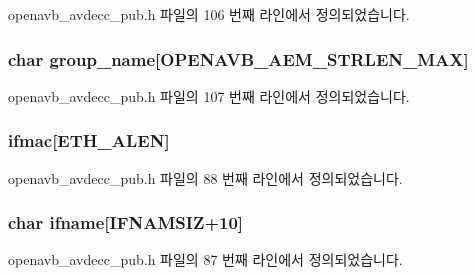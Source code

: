 openavb\+\_\+avdecc\+\_\+pub.\+h 파일의 106 번째 라인에서 정의되었습니다.

\subsubsection[{\texorpdfstring{group\+\_\+name}{group_name}}]{\setlength{\rightskip}{0pt plus 5cm}char group\+\_\+name\mbox{[}{\bf O\+P\+E\+N\+A\+V\+B\+\_\+\+A\+E\+M\+\_\+\+S\+T\+R\+L\+E\+N\+\_\+\+M\+AX}\mbox{]}}\hypertarget{structopenavb__avdecc__cfg__t_a4089e7b5575e5dda250db1b7c4343dd5}{}\label{structopenavb__avdecc__cfg__t_a4089e7b5575e5dda250db1b7c4343dd5}


openavb\+\_\+avdecc\+\_\+pub.\+h 파일의 107 번째 라인에서 정의되었습니다.

\subsubsection[{\texorpdfstring{ifmac}{ifmac}}]{ ifmac\mbox{[}{\bf E\+T\+H\+\_\+\+A\+L\+EN}\mbox{]}}\hypertarget{structopenavb__avdecc__cfg__t_adc83f17023461d176d86627c972fcf3e}{}\label{structopenavb__avdecc__cfg__t_adc83f17023461d176d86627c972fcf3e}


openavb\+\_\+avdecc\+\_\+pub.\+h 파일의 88 번째 라인에서 정의되었습니다.

\subsubsection[{\texorpdfstring{ifname}{ifname}}]{\setlength{\rightskip}{0pt plus 5cm}char ifname\mbox{[}{\bf I\+F\+N\+A\+M\+S\+IZ}+10\mbox{]}}\hypertarget{structopenavb__avdecc__cfg__t_a11d6071e5fa37b0c5776e17651485f11}{}\label{structopenavb__avdecc__cfg__t_a11d6071e5fa37b0c5776e17651485f11}


openavb\+\_\+avdecc\+\_\+pub.\+h 파일의 87 번째 라인에서 정의되었습니다.

